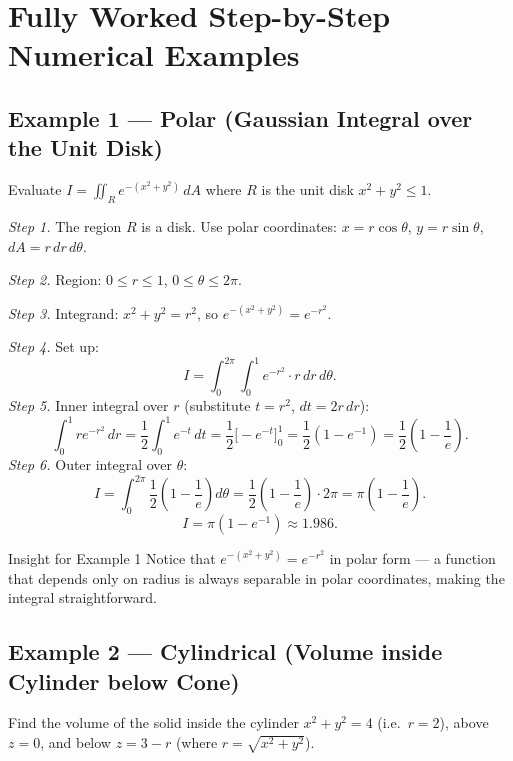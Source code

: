 \documentclass[12pt,a4paper]{article}
\begin{document}
\section{Fully Worked Step-by-Step Numerical Examples}

\subsection*{Example 1 --- Polar (Gaussian Integral over the Unit Disk)}

Evaluate $\displaystyle I = \iint_R e^{-(x^2+y^2)}\,dA$ where $R$ is the unit disk $x^2+y^2 \leq 1$.

\textit{Step 1.}  The region $R$ is a disk. Use polar coordinates: $x = r\cos\theta$, $y = r\sin\theta$,
$dA = r\,dr\,d\theta$.

\textit{Step 2.}  Region: $0 \leq r \leq 1$, $0 \leq \theta \leq 2\pi$.

\textit{Step 3.}  Integrand: $x^2+y^2 = r^2$, so $e^{-(x^2+y^2)} = e^{-r^2}$.

\textit{Step 4.}  Set up:
\[
  I = \int_0^{2\pi}\int_0^1 e^{-r^2} \cdot r\,dr\,d\theta.
\]
\textit{Step 5.}  Inner integral over $r$ (substitute $t = r^2$, $dt = 2r\,dr$):
\[
  \int_0^1 r e^{-r^2}\,dr = \frac{1}{2}\int_0^1 e^{-t}\,dt
  = \frac{1}{2}\bigl[-e^{-t}\bigr]_0^1
  = \frac{1}{2}(1 - e^{-1})
  = \frac{1}{2}\!\left(1 - \frac{1}{e}\right).
\]
\textit{Step 6.}  Outer integral over $\theta$:
\[
  I = \int_0^{2\pi} \frac{1}{2}\!\left(1 - \frac{1}{e}\right)d\theta
    = \frac{1}{2}\!\left(1 - \frac{1}{e}\right) \cdot 2\pi
    = \pi\!\left(1 - \frac{1}{e}\right).
\]
\[
  \boxed{I = \pi\!\left(1 - e^{-1}\right) \approx 1.986.}
\]

\begin{learnbox}{Insight for Example 1}
Notice that $e^{-(x^2+y^2)} = e^{-r^2}$ in polar form --- a function that depends only on radius
is always separable in polar coordinates, making the integral straightforward.
\end{learnbox}

\subsection*{Example 2 --- Cylindrical (Volume inside Cylinder below Cone)}

Find the volume of the solid inside the cylinder $x^2+y^2 = 4$ (i.e.\ $r=2$), above $z=0$, and
below $z = 3 - r$ (where $r = \sqrt{x^2+y^2}$).
\end{document}
